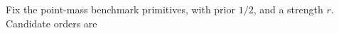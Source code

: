 Fix the point-mass benchmark primitives, with prior \(1/2\), and a strength \(r\). Candidate orders are
